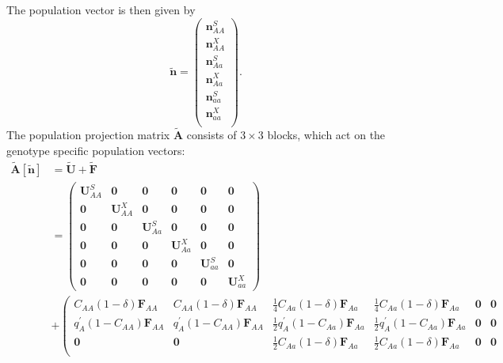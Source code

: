 \documentclass[11pt]{article}
\def\mbf#1{\mathbf{#1}}
\begin{document}
The population vector is then given by 
\begin{equation}
	\tilde{\mbf{n}} = \left(
			\begin{array}{c}
							\mbf{n}^S_{AA} \\
							\mbf{n}^X_{AA} \\ \hline
							\mbf{n}^S_{Aa} \\
							\mbf{n}^X_{Aa} \\ \hline
							\mbf{n}^S_{aa} \\
							\mbf{n}^X_{aa} \\
			\end{array} \right).
\end{equation}
The population projection matrix $\tilde{\mbf{A}}$ consists of $3 \times 3$ blocks, which act on the genotype specific population vectors:
{
\small
\begin{align*} 
	\tilde{\mbf{A}}[\tilde{\mbf{n}}] &= \tilde{\mbf{U}} + \tilde{\mbf{F}}\\
		&= \left(
			\begin{array}{cc|cc|cc}
				\mathbf{U}^S_{AA} & \mbf{0} & \mbf{0} & \mbf{0} & \mbf{0} & \mbf{0} \\ 
				\mbf{0} & \mathbf{U}^X_{AA} & \mbf{0} & \mbf{0} & \mbf{0} & \mbf{0} \\\hline
				\mbf{0} & \mbf{0} & \mathbf{U}^S_{Aa} & \mbf{0} & \mbf{0} & \mbf{0} \\
				\mbf{0} & \mbf{0} & \mbf{0} & \mathbf{U}^X_{Aa} & \mbf{0} &  \mbf{0}\\\hline
				\mbf{0} & \mbf{0} & \mbf{0} & \mbf{0} & \mathbf{U}^S_{aa} & \mbf{0} \\ 
				\mbf{0} & \mbf{0} & \mbf{0} & \mbf{0} & \mbf{0} & \mathbf{U}^X_{aa}
			\end{array} \right) \\ 
		&+ \left(
			\begin{array}{cc|cc|cc}
				C_{AA} (1 - \delta) \mbf{F}_{AA} & C_{AA} (1 - \delta) \mbf{F}_{AA}  & \frac{1}{4} C_{Aa} (1 - \delta) \mbf{F}_{Aa} & \frac{1}{4} C_{Aa} (1 - \delta) \mbf{F}_{Aa} & \mbf{0} & \mbf{0} \\ 
				q^{\prime}_{A}  (1 - C_{AA}) \mbf{F}_{AA}& q^{\prime}_{A} (1 - C_{AA}) \mbf{F}_{AA} & \frac{1}{2} q^{\prime}_{A} (1 - C_{Aa})\mbf{F}_{Aa}  & \frac{1}{2} q^{\prime}_{A} (1 - C_{Aa})\mbf{F}_{Aa}  & \mbf{0} & \mbf{0} \\ \hline
				\mbf{0} & \mbf{0} & \frac{1}{2} C_{Aa} (1 - \delta) \mbf{F}_{Aa} & \frac{1}{2} C_{Aa} (1 - \delta) \mbf{F}_{Aa}& \mbf{0} & \mbf{0} \\

\end{array}
\end{align*}}
\end{document}
